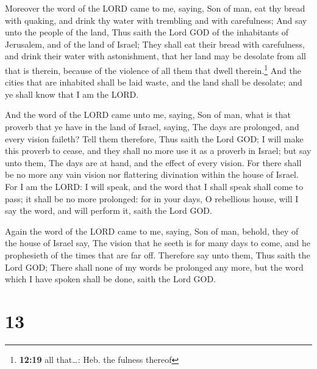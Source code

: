  Moreover the word of the LORD came to me, saying,
 Son of man, eat thy bread with quaking, and drink thy
water with trembling and with carefulness;  And say unto
the people of the land, Thus saith the Lord GOD of the inhabitants of
Jerusalem, and of the land of Israel; They shall eat their bread with
carefulness, and drink their water with astonishment, that her land may
be desolate from all that is therein, because of the violence of all
them that dwell therein.\footnote{\textbf{12:19} all that\ldots: Heb.
  the fulness thereof}  And the cities that are inhabited
shall be laid waste, and the land shall be desolate; and ye shall know
that I am the LORD.

 And the word of the LORD came unto me, saying,
 Son of man, what is that proverb that ye have in the
land of Israel, saying, The days are prolonged, and every vision
faileth?  Tell them therefore, Thus saith the Lord GOD; I
will make this proverb to cease, and they shall no more use it as a
proverb in Israel; but say unto them, The days are at hand, and the
effect of every vision.  For there shall be no more any
vain vision nor flattering divination within the house of Israel.
 For I am the LORD: I will speak, and the word that I
shall speak shall come to pass; it shall be no more prolonged: for in
your days, O rebellious house, will I say the word, and will perform it,
saith the Lord GOD.

 Again the word of the LORD came to me, saying,
 Son of man, behold, they of the house of Israel say, The
vision that he seeth is for many days to come, and he prophesieth of the
times that are far off.  Therefore say unto them, Thus
saith the Lord GOD; There shall none of my words be prolonged any more,
but the word which I have spoken shall be done, saith the Lord GOD.

\hypertarget{section-12}{%
\section{13}\label{section-12}}

